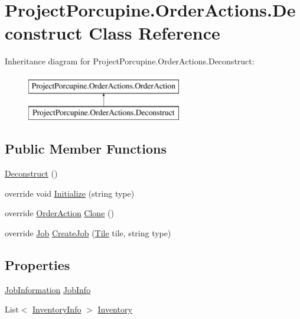 \hypertarget{class_project_porcupine_1_1_order_actions_1_1_deconstruct}{}\section{Project\+Porcupine.\+Order\+Actions.\+Deconstruct Class Reference}
\label{class_project_porcupine_1_1_order_actions_1_1_deconstruct}
Inheritance diagram for Project\+Porcupine.\+Order\+Actions.\+Deconstruct\+:\begin{figure}[H]
\begin{center}
\leavevmode
\includegraphics[height=2.000000cm]{class_project_porcupine_1_1_order_actions_1_1_deconstruct}
\end{center}
\end{figure}
\subsection*{Public Member Functions}
\begin{DoxyCompactItemize}
\item 
\hyperlink{class_project_porcupine_1_1_order_actions_1_1_deconstruct_ae0f9ab8870c184282544d75fd27b7be1}{Deconstruct} ()
\item 
override void \hyperlink{class_project_porcupine_1_1_order_actions_1_1_deconstruct_a923875ef4803626e5ee1b627ff32d100}{Initialize} (string type)
\item 
override \hyperlink{class_project_porcupine_1_1_order_actions_1_1_order_action}{Order\+Action} \hyperlink{class_project_porcupine_1_1_order_actions_1_1_deconstruct_aa769294eedaf91d184ec166705181a8a}{Clone} ()
\item 
override \hyperlink{class_job}{Job} \hyperlink{class_project_porcupine_1_1_order_actions_1_1_deconstruct_a7f242b2767ac56ef47c07f04b3c86d2a}{Create\+Job} (\hyperlink{class_tile}{Tile} tile, string type)
\end{DoxyCompactItemize}
\subsection*{Properties}
\begin{DoxyCompactItemize}
\item 
\hyperlink{class_project_porcupine_1_1_order_actions_1_1_order_action_1_1_job_information}{Job\+Information} \hyperlink{class_project_porcupine_1_1_order_actions_1_1_deconstruct_a6237e8f5b38b1b25c99be943cd7fa106}{Job\+Info}
\item 
List$<$ \hyperlink{class_project_porcupine_1_1_order_actions_1_1_order_action_1_1_inventory_info}{Inventory\+Info} $>$ \hyperlink{class_project_porcupine_1_1_order_actions_1_1_deconstruct_a66992d44538f707c647f1b173fc1208d}{Inventory}
\end{DoxyCompactItemize}
